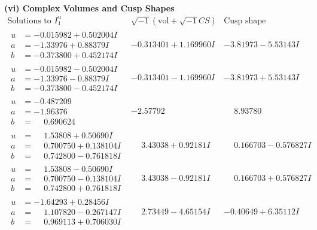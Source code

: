 \documentclass[1p]{elsarticle_modified}
\theoremstyle{definition}
\newcommand{\I}{\sqrt{-1}}
\begin{document}
\newpage\flushleft \textbf{(vi) Complex Volumes and Cusp Shapes}
$$\begin{array}{c|c|c}  
\text{Solutions to }I^u_{1}& \I (\text{vol} + \sqrt{-1}CS) & \text{Cusp shape}\\
 \hline 
\begin{aligned}
u &= -0.015982 + 0.502004 I \\
a &= -1.33976 + 0.88379 I \\
b &= -0.373800 + 0.452174 I\end{aligned}
 & -0.313401 + 1.169960 I & -3.81973 - 5.53143 I \\ \hline\begin{aligned}
u &= -0.015982 - 0.502004 I \\
a &= -1.33976 - 0.88379 I \\
b &= -0.373800 - 0.452174 I\end{aligned}
 & -0.313401 - 1.169960 I & -3.81973 + 5.53143 I \\ \hline\begin{aligned}
u &= -0.487209\phantom{ +0.000000I} \\
a &= -1.96376\phantom{ +0.000000I} \\
b &= \phantom{-}0.690624\phantom{ +0.000000I}\end{aligned}
 & -2.57792\phantom{ +0.000000I} & \phantom{-}8.93780\phantom{ +0.000000I} \\ \hline\begin{aligned}
u &= \phantom{-}1.53808 + 0.50690 I \\
a &= \phantom{-}0.700750 + 0.138104 I \\
b &= \phantom{-}0.742800 - 0.761818 I\end{aligned}
 & \phantom{-}3.43038 + 0.92181 I & \phantom{-}0.166703 - 0.576827 I \\ \hline\begin{aligned}
u &= \phantom{-}1.53808 - 0.50690 I \\
a &= \phantom{-}0.700750 - 0.138104 I \\
b &= \phantom{-}0.742800 + 0.761818 I\end{aligned}
 & \phantom{-}3.43038 - 0.92181 I & \phantom{-}0.166703 + 0.576827 I \\ \hline\begin{aligned}
u &= -1.64293 + 0.28456 I \\
a &= \phantom{-}1.107820 - 0.267147 I \\
b &= \phantom{-}0.969113 + 0.706030 I\end{aligned}
 & \phantom{-}2.73449 - 4.65154 I & -0.40649 + 6.35112 I \\ \hline\begin{aligned}

\end{aligned}
\end{array}$$
\end{document}
